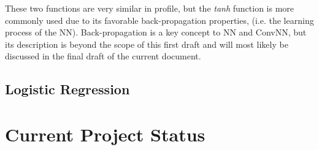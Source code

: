 \documentclass[letterpaper,12pt]{article}
\begin{document}
These two functions are very similar in profile, but the \textit{tanh} function is more commonly used due to its favorable back-propagation properties, (i.e. the learning process of the NN). Back-propagation is a key concept to NN and ConvNN, but its description is beyond the scope of this first draft and will most likely be discussed in the final draft of the current document.

\subsection{Logistic Regression}

\section{Current Project Status}
\newpage


\end{document}
